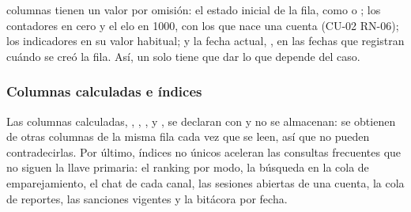 \bdNumOmision{} columnas tienen un valor por omisión: el estado inicial de la fila, como  o ; los contadores en cero y el elo en 1000, con los que nace una cuenta (\mbox{CU-02} \mbox{RN-06}); los indicadores en su valor habitual; y la fecha actual, , en las fechas que registran cuándo se creó la fila. Así, un  solo tiene que dar lo que depende del caso.



\subsubsection*{Columnas calculadas e índices}

Las \bdNumCalculadas{} columnas calculadas, , , ,  y , se declaran con  y no se almacenan: se obtienen de otras columnas de la misma fila cada vez que se leen, así que no pueden contradecirlas. Por último, \bdNumIndices{} índices no únicos aceleran las consultas frecuentes que no siguen la llave primaria: el ranking por modo, la búsqueda en la cola de emparejamiento, el chat de cada canal, las sesiones abiertas de una cuenta, la cola de reportes, las sanciones vigentes y la bitácora por fecha.
